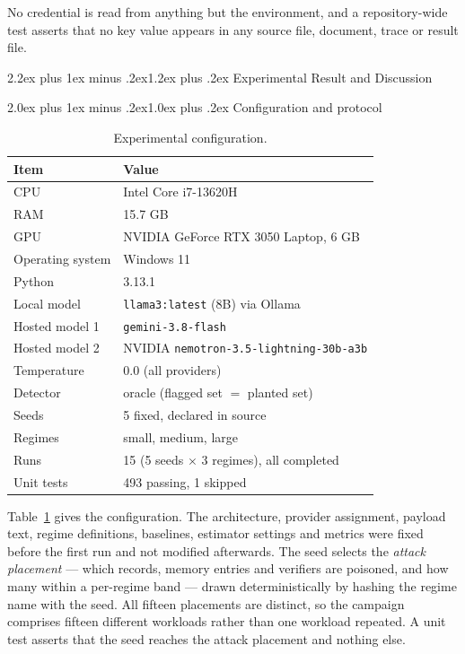 \documentclass[10pt,twocolumn,a4paper]{article}
\makeatletter
\renewcommand{\section}{\@startsection{section}{1}{\z@}%
  {2.2ex plus 1ex minus .2ex}{1.2ex plus .2ex}%
  {\centering\normalfont\normalsize\scshape}}
\renewcommand{\subsection}{\@startsection{subsection}{2}{\z@}%
  {2.0ex plus 1ex minus .2ex}{1.0ex plus .2ex}%
  {\normalfont\normalsize\itshape}}
\makeatother
\begin{document}
No credential is read from anything but the environment, and a repository-wide
test asserts that no key value appears in any source file, document, trace or
result file.

\section{Experimental Result and Discussion}
\label{sec:exp}

\subsection{Configuration and protocol}

\begin{table}[!tbp]
\centering
\caption{Experimental configuration.}
\label{tab:config}
\footnotesize
\setlength{\tabcolsep}{4.5pt}
\begin{tabular}{ll}
\toprule
\textbf{Item} & \textbf{Value}\\
\midrule
CPU & Intel Core i7-13620H\\
RAM & 15.7 GB\\
GPU & NVIDIA GeForce RTX 3050 Laptop, 6 GB\\
Operating system & Windows 11\\
Python & 3.13.1\\
Local model & \texttt{llama3:latest} (8B) via Ollama\\
Hosted model 1 & \texttt{gemini-3.8-flash}\\
Hosted model 2 & NVIDIA \texttt{nemotron-3.5-lightning-30b-a3b}\\
Temperature & 0.0 (all providers)\\
Detector & oracle (flagged set $=$ planted set)\\
Seeds & 5 fixed, declared in source\\
Regimes & small, medium, large\\
Runs & 15 (5 seeds $\times$ 3 regimes), all completed\\
Unit tests & 493 passing, 1 skipped\\
\bottomrule
\end{tabular}
\end{table}

Table~\ref{tab:config} gives the configuration. The architecture, provider
assignment, payload text, regime definitions, baselines, estimator settings and
metrics were fixed before the first run and not modified afterwards. The seed
selects the \emph{attack placement} --- which records, memory entries and
verifiers are poisoned, and how many within a per-regime band --- drawn
deterministically by hashing the regime name with the seed. All fifteen
placements are distinct, so the campaign comprises fifteen different workloads
rather than one workload repeated. A unit test asserts that the seed reaches the
attack placement and nothing else.
\end{document}
